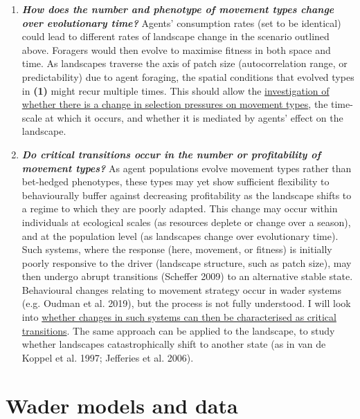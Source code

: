 \documentclass[]{scrartcl}
\begin{document}
\begin{linenumbers}
\begin{enumerate}
\begin{enumerate}
  \item
    
    \emph{\textbf{How does the number and phenotype of movement types
    change over evolutionary time?}} Agents' consumption rates (set to
    be identical) could lead to different rates of landscape change in
    the scenario outlined above. Foragers would then evolve to maximise
    fitness in both space and time. As landscapes traverse the axis of
    patch size (autocorrelation range, or predictability) due to agent
    foraging, the spatial conditions that evolved types in \textbf{(1)}
    might recur multiple times. This should allow the
    \underline{investigation of whether there is a change in selection
    pressures on movement types}, the time-scale at which it occurs, and
    whether it is mediated by agents' effect on the landscape.
    
  \item
    
    \emph{\textbf{Do critical transitions occur in the number or
    profitability of movement types?}} As agent populations evolve
    movement types rather than bet-hedged phenotypes, these types may
    yet show sufficient flexibility to behaviourally buffer against
    decreasing profitability as the landscape shifts to a regime to
    which they are poorly adapted. This change may occur within
    individuals at ecological scales (as resources deplete or change
    over a season), and at the population level (as landscapes change
    over evolutionary time). Such systems, where the response (here,
    movement, or fitness) is initially poorly responsive to the driver
    (landscape structure, such as patch size), may then undergo abrupt
    transitions (Scheffer 2009) to an alternative stable state.
    Behavioural changes relating to movement strategy occur in wader
    systems (e.g. Oudman et al. 2019), but the process is not fully
    understood. I will look into \underline{whether changes in such systems
    can then be characterised as critical transitions}. The same
    approach can be applied to the landscape, to study whether
    landscapes catastrophically shift to another state (as in van de
    Koppel et al. 1997; Jefferies et al. 2006).
    
  \end{enumerate}
\end{enumerate}

\section{Wader models and data}\label{wader-models-and-data}



\end{linenumbers}
\end{document}
